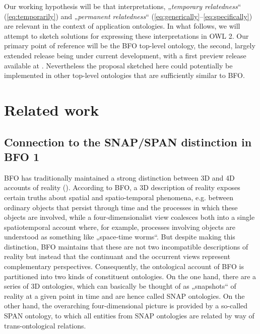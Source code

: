 \documentclass{ao2e}
\begin{document}
Our working hypothesis will be that interpretations, „\emph{temporary
relatedness}“ (\ref{eq:temporarily}) and „\emph{permanent relatedness}“
(\ref{eq:generically}--\ref{eq:specifically}) are relevant in the context of
application ontologies. %
 In what follows,
we will attempt to sketch solutions for expressing these interpretations in OWL
2. Our primary point of reference will be the BFO top-level ontology, the
second, largely extended release being under current development, with a first
preview release available at .  Nevertheless
the proposal sketched here could potentially be implemented in other top-level
ontologies that are sufficiently similar to BFO.

\section{Related work}
\subsection{Connection to the SNAP/SPAN distinction in BFO 1}


BFO has traditionally maintained a strong distinction between 3D and 4D accounts
of reality (\cite{BFO1:ref}). According to BFO, a 3D description of reality exposes certain
truths about spatial and spatio-temporal phenomena, e.g. between ordinary
objects that persist through time and the processes in which these objects are
involved, while a four-dimensionalist view coalesces both into a single
spatiotemporal account where, for example, processes involving objects are
understood as something like „space-time worms“.  But despite making this
distinction, BFO maintains that these are not two incompatible descriptions of
reality but instead that the continuant and the occurrent views represent
complementary perspectives. Consequently, the ontological account of BFO is
partitioned into two kinds of constituent ontologies. On the one hand, there are
a series of 3D ontologies, which can basically be thought of as „snapshots“ of
reality at a given point in time and are hence called SNAP ontologies. On the
other hand, the overarching four-dimensional picture is provided by a so-called
SPAN ontology, to which all entities from SNAP ontologies are related by way of
trans-ontological relations.
\end{document}
